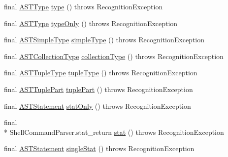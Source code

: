 \begin{DoxyCompactItemize}
final \hyperlink{classorg_1_1tzi_1_1use_1_1parser_1_1ocl_1_1_a_s_t_type}{A\-S\-T\-Type} \hyperlink{classorg_1_1tzi_1_1use_1_1parser_1_1shell_1_1_shell_command_parser_a5d2983b69b117a53d59bc10fc86ed863}{type} ()  throws Recognition\-Exception 
\item 
final \hyperlink{classorg_1_1tzi_1_1use_1_1parser_1_1ocl_1_1_a_s_t_type}{A\-S\-T\-Type} \hyperlink{classorg_1_1tzi_1_1use_1_1parser_1_1shell_1_1_shell_command_parser_a513746c54502c631dcaf87445a69bbb9}{type\-Only} ()  throws Recognition\-Exception 
\item 
final \hyperlink{classorg_1_1tzi_1_1use_1_1parser_1_1ocl_1_1_a_s_t_simple_type}{A\-S\-T\-Simple\-Type} \hyperlink{classorg_1_1tzi_1_1use_1_1parser_1_1shell_1_1_shell_command_parser_a14a83a36ae0e91a083ca2dcc5c7175ec}{simple\-Type} ()  throws Recognition\-Exception 
\item 
final \hyperlink{classorg_1_1tzi_1_1use_1_1parser_1_1ocl_1_1_a_s_t_collection_type}{A\-S\-T\-Collection\-Type} \hyperlink{classorg_1_1tzi_1_1use_1_1parser_1_1shell_1_1_shell_command_parser_a9ddcfa548f3f697c12fd726afa939e56}{collection\-Type} ()  throws Recognition\-Exception 
\item 
final \hyperlink{classorg_1_1tzi_1_1use_1_1parser_1_1ocl_1_1_a_s_t_tuple_type}{A\-S\-T\-Tuple\-Type} \hyperlink{classorg_1_1tzi_1_1use_1_1parser_1_1shell_1_1_shell_command_parser_a115627fe825518990a660c1f86753770}{tuple\-Type} ()  throws Recognition\-Exception 
\item 
final \hyperlink{classorg_1_1tzi_1_1use_1_1parser_1_1ocl_1_1_a_s_t_tuple_part}{A\-S\-T\-Tuple\-Part} \hyperlink{classorg_1_1tzi_1_1use_1_1parser_1_1shell_1_1_shell_command_parser_ab97c60694132c9198d60db3ab9a8b09d}{tuple\-Part} ()  throws Recognition\-Exception 
\item 
final \hyperlink{classorg_1_1tzi_1_1use_1_1parser_1_1soil_1_1ast_1_1_a_s_t_statement}{A\-S\-T\-Statement} \hyperlink{classorg_1_1tzi_1_1use_1_1parser_1_1shell_1_1_shell_command_parser_ae7d6472e733597e1d860786b59646d45}{stat\-Only} ()  throws Recognition\-Exception 
\item 
final \\*
Shell\-Command\-Parser.\-stat\-\_\-return \hyperlink{classorg_1_1tzi_1_1use_1_1parser_1_1shell_1_1_shell_command_parser_a95b02fb17fc394f186ce1ad89528f31b}{stat} ()  throws Recognition\-Exception 
\item 
final \hyperlink{classorg_1_1tzi_1_1use_1_1parser_1_1soil_1_1ast_1_1_a_s_t_statement}{A\-S\-T\-Statement} \hyperlink{classorg_1_1tzi_1_1use_1_1parser_1_1shell_1_1_shell_command_parser_a1a3b7ba20ab41751762a1987adb05f29}{single\-Stat} ()  throws Recognition\-Exception 

\end{DoxyCompactItemize}

